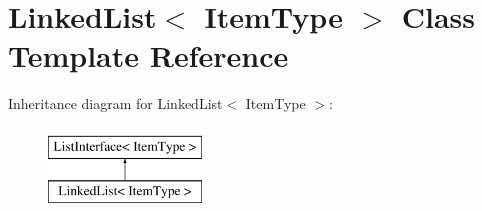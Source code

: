 \hypertarget{class_linked_list}{\section{Linked\-List$<$ Item\-Type $>$ Class Template Reference}
\label{class_linked_list}
}
Inheritance diagram for Linked\-List$<$ Item\-Type $>$\-:\begin{figure}[H]
\begin{center}
\leavevmode
\includegraphics[height=2.000000cm]{class_linked_list}
\end{center}
\end{figure}
